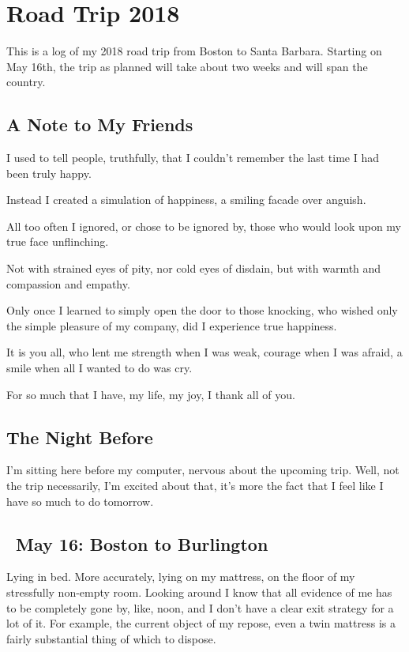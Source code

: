 \documentclass[../butidigress.tex]{subfiles}
\begin{document}
\chapter{Road Trip 2018}
\newpage
This is a log of my 2018 road trip from Boston to Santa Barbara.
Starting on May 16th, the trip as planned will take about two weeks and will span the country.

\section*{A Note to My Friends}
I used to tell people, truthfully, that I couldn't remember the last time I had been truly happy.

Instead I created a simulation of happiness, a smiling facade over anguish.

All too often I ignored, or chose to be ignored by, those who would look upon my true face unflinching.

Not with strained eyes of pity, nor cold eyes of disdain, but with warmth and compassion and empathy.

Only once I learned to simply open the door to those knocking, who wished only the simple pleasure of my company, did I experience true happiness.

\hspace*{2em} It is you all, who lent me strength when I was weak, courage when I was afraid, a smile when all I wanted to do was cry.

\hspace*{2em} For so much that I have, my life, my joy, I thank all of you.

\section*{The Night Before}
I'm sitting here before my computer, nervous about the upcoming trip.
Well, not the trip necessarily, I'm excited about that, it's more the fact that I feel like I have so much to do tomorrow.

\renewcommand{\thesection}{Day \arabic{section}\ }

\section{\ May 16: Boston to Burlington}
Lying in bed.
More accurately, lying on my mattress, on the floor of my stressfully non-empty room.
Looking around I know that all evidence of me has to be completely gone by, like, noon, and I don't have a clear exit strategy for a lot of it.
For example, the current object of my repose, even a twin mattress is a fairly substantial thing of which to dispose.
\end{document}
